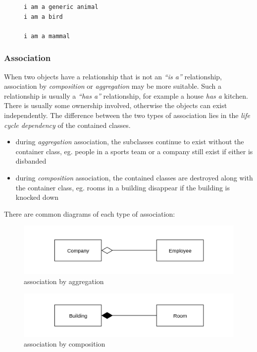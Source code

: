 \documentclass[9pt]{article}
\begin{document}
\begin{figure}[H]
\begin{verbatim}
i am a generic animal
i am a bird

i am a mammal
\end{verbatim}
\end{figure}

\subsubsection{Association}
\label{sec:org6018496}

When two objects have a relationship that is not an \emph{``is a''} relationship, association by \emph{composition} or \emph{aggregation} may be more suitable. Such a relationship is usually a \emph{``has a''} relationship, for example a house \emph{has a} kitchen. There is usually some ownership involved, otherwise the objects can exist independently. The difference between the two types of association lies in the \emph{life cycle dependency} of the contained classes.

\begin{itemize}
\item during \emph{aggregation} association, the subclasses continue to exist without the container class, eg. people in a sports team or a company still exist if either is disbanded
\item during \emph{composition} association, the contained classes are destroyed along with the container class, eg. rooms in a building disappear if the building is knocked down
\end{itemize}

There are common diagrams of each type of association:

\begin{figure}[htbp]
\centering
\includegraphics[width=.9\linewidth]{./images/aggregation.png}
\caption{association by aggregation}
\end{figure}

\begin{figure}[htbp]
\centering
\includegraphics[width=.9\linewidth]{./images/composition.png}
\caption{association by composition}
\end{figure}
\end{document}
